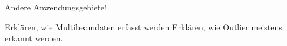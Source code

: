 
Andere Anwendungsgebiete!

Erklären, wie Multibeamdaten erfasst werden
Erklären, wie Outlier meistens erkannt werden.
